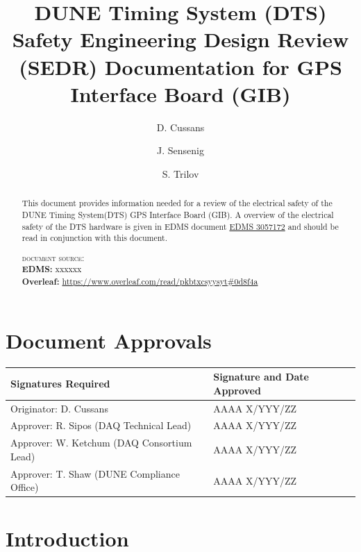 \documentclass[fleqn,12pt,a4paper]{olplainarticle}
\title{DUNE Timing System (DTS) Safety Engineering Design Review (SEDR) Documentation for GPS Interface Board (GIB)}
\author[1]{D. Cussans}
\author[2]{J. Sensenig}
\author[1]{S. Trilov}
\affil[1]{H.H. Wills Physics Laboratory, Bristol, UK}
\affil[2]{David Rittenhouse Laboratory, Philadelphia, USA}
\begin{document}

\begin{abstract}
This document provides information needed for a review of the electrical safety of the DUNE Timing System(DTS) GPS Interface Board (GIB). A overview of the electrical safety of the DTS hardware is given in EDMS document \href{https://edms.cern.ch/document/3057172/1}{EDMS 3057172}\cite{ref:dts-sedr-overview} and should be read in conjunction with this document.

\textsc{document source:}\\
{\bf EDMS:} xxxxxx \\
{\bf Overleaf:}  \url{https://www.overleaf.com/read/pkbtxcsyysyt\#0d8f4a}

\end{abstract}


\flushbottom

\maketitle

\begin{versionhistory}
\end{versionhistory}

\section*{Document Approvals}

\begin{table}[tbh]
    \centering
    \begin{tabular}{p{}|R{0.35\textwidth}}
        Signatures Required   &  Signature and Date Approved\\ \hline
        Originator: D. Cussans                     &  AAAA  X/YYY/ZZ \\
        Approver: R. Sipos (DAQ Technical Lead)    &  AAAA   X/YYY/ZZ  \\
        Approver: W. Ketchum (DAQ Consortium Lead)    &  AAAA    X/YYY/ZZ  \\
        Approver: T. Shaw (DUNE Compliance Office) &  AAAA X/YYY/ZZ           \\
    \end{tabular}
    \label{tab:approvals}
\end{table}
\newpage

\section{Introduction}
\end{document}

